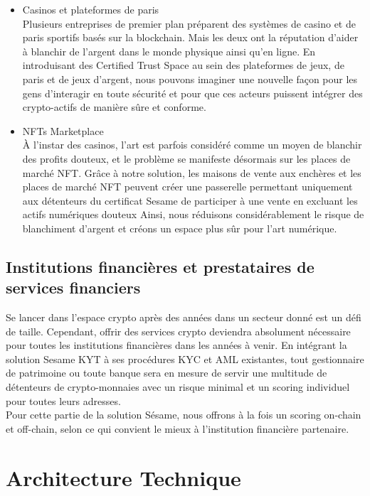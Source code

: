 ﻿\documentclass[a4paper]{article}
\let\OldTexttrademark\texttrademark
\renewcommand{\texttrademark}{\OldTexttrademark\xspace}%
\newcommand{\smallvspace}{\vspace{4pt} \\}
\begin{document}
\begin{itemize}
\item 
Casinos et plateformes de paris \smallvspace
Plusieurs entreprises de premier plan préparent des systèmes de casino et de paris sportifs basés sur la blockchain. Mais les deux ont la réputation d’aider à blanchir de l'argent dans le monde physique ainsi qu'en ligne. En introduisant des Certified Trust Space\texttrademark au sein des plateformes de jeux, de paris et de jeux d'argent, nous pouvons imaginer une nouvelle façon pour les gens d'interagir en toute sécurité et pour que ces acteurs puissent intégrer des crypto-actifs de manière sûre et conforme.

\item 
NFTs Marketplace \smallvspace
À l'instar des casinos, l'art est parfois considéré comme un moyen de blanchir des profits douteux, et le problème se manifeste désormais sur les places de marché NFT. Grâce à notre solution, les maisons de vente aux enchères et les places de marché NFT peuvent créer une passerelle permettant uniquement aux détenteurs du certificat Sesame de participer à une vente en excluant les actifs numériques douteux Ainsi, nous réduisons considérablement le risque de blanchiment d'argent et créons un espace plus sûr pour l'art numérique.
\end{itemize}

\subsection{Institutions financières et prestataires de services financiers}
Se lancer dans l'espace crypto après des années dans un secteur donné est un défi de taille. Cependant, offrir des services crypto deviendra absolument nécessaire pour toutes les institutions financières dans les années à venir. En intégrant la solution Sesame KYT à ses procédures KYC et AML existantes, tout gestionnaire de patrimoine ou toute banque sera en mesure de servir une multitude de détenteurs de crypto-monnaies avec un risque minimal et un scoring individuel pour toutes leurs adresses. \\

Pour cette partie de la solution Sésame, nous offrons à la fois un scoring on-chain et off-chain, selon ce qui convient le mieux à l'institution financière partenaire.

\newpage
\section{Architecture Technique}
\end{document}
